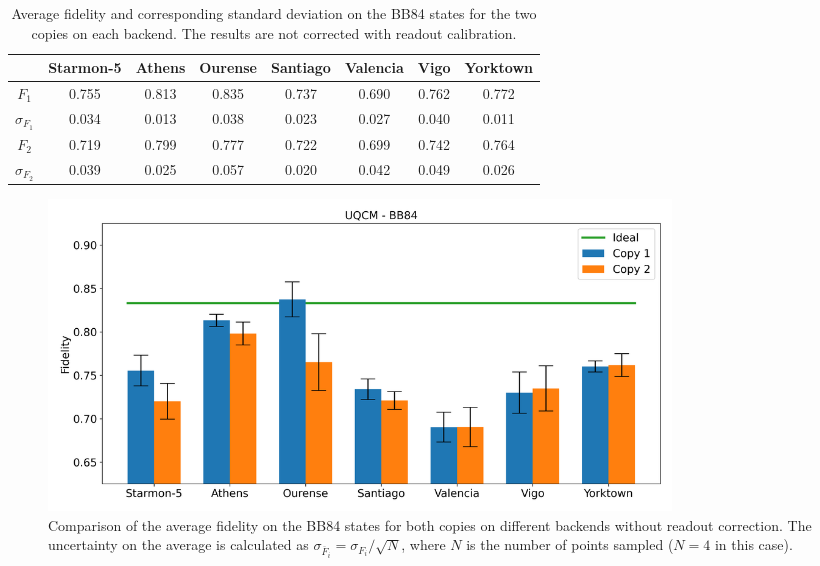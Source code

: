 \begin{table}[H]
    \centering
    \begin{tabular}{|c|c|c|c|c|c|c|c|}
    \hline
    \textbf{} & \textbf{Starmon-5} & \textbf{Athens} & \textbf{Ourense} & \textbf{Santiago} & \textbf{Valencia} & \textbf{Vigo} & \textbf{Yorktown} \\ \hline
    $F_1$              & 0.755 & 0.813 & 0.835 & 0.737 & 0.690 & 0.762 & 0.772\\ \hline
    $\sigma_{F_1}$     & 0.034 & 0.013 & 0.038 & 0.023 & 0.027 & 0.040 & 0.011 \\ \hline
    $F_2$              & 0.719 & 0.799 & 0.777 & 0.722 & 0.699 & 0.742 & 0.764 \\ \hline
    $\sigma_{F_2}$     & 0.039 & 0.025 & 0.057 & 0.020 & 0.042 & 0.049 & 0.026 \\ \hline
    \end{tabular}
    \caption{Average fidelity and corresponding standard deviation on the BB84 states for the two copies on each backend. The results are not corrected with readout calibration.}\label{tab:uqcm_results_bb_non}
\end{table}


\begin{figure}[H]
    \centering
            \includegraphics[width=0.8\textwidth]{Figures/UQCM/Histograms/histo_bb84_corrected.png}
        
        \caption{Comparison of the average fidelity on the BB84 states for both copies on different backends without readout correction. The uncertainty on the average is calculated as $\sigma_{\overline{F}_i}=\sigma_{F_i}/\sqrt{N}$, where $N$ is the number of points sampled ($N=4$ in this case).}\label{fig:hist_uqcm_bb84}
\end{figure}

